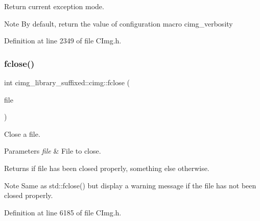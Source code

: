 Return current  exception mode. 

\begin{DoxyNote}{Note}
By default, return the value of configuration macro {\ttfamily cimg\+\_\+verbosity} 
\end{DoxyNote}


Definition at line 2349 of file C\+Img.\+h.

\mbox{\label{namespacecimg__library__suffixed_1_1cimg_ac436b94e6ffef5fd420bb3d7c05fd416}} 
\subsubsection{\texorpdfstring{fclose()}{fclose()}}
{\footnotesize\ttfamily int cimg\+\_\+library\+\_\+suffixed\+::cimg\+::fclose (\begin{DoxyParamCaption}\item[{std\+::\+F\+I\+LE $\ast$}]{file }\end{DoxyParamCaption})\hspace{0.3cm}{\ttfamily [inline]}}



Close a file. 


\begin{DoxyParams}{Parameters}
{\em file} & File to close. \\
\hline
\end{DoxyParams}
\begin{DoxyReturn}{Returns}
{} if file has been closed properly, something else otherwise. 
\end{DoxyReturn}
\begin{DoxyNote}{Note}
Same as {\ttfamily std\+::fclose()} but display a warning message if the file has not been closed properly. 
\end{DoxyNote}


Definition at line 6185 of file C\+Img.\+h.



